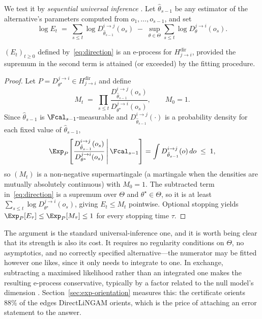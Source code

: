 We test it by \emph{sequential universal inference}
\citep{wasserman2020universal}. Let $\hat\theta_{s-1}$ be any estimator of the
alternative's parameters computed from $o_1, \dots, o_{s-1}$, and set
\begin{equation}\label{eq:direction}
\log E_t \;=\; \sum_{s \le t} \log D^{i \to j}_{\hat\theta_{s-1}}(o_s)
\;-\; \sup_{\theta \in \Theta} \sum_{s \le t} \log D^{j \to i}_{\theta}(o_s).
\end{equation}

\begin{proposition}\label{prop:direction}
$(E_t)_{t \ge 0}$ defined by~\eqref{eq:direction} is an e-process for
$H^{\mathrm{dir}}_{j \to i}$, provided the supremum in the second term is
attained (or exceeded) by the fitting procedure.
\end{proposition}

\begin{proof}
Let $P = D^{j \to i}_{\theta^\star} \in H^{\mathrm{dir}}_{j \to i}$ and define
\begin{equation*}
M_t \;=\; \prod_{s \le t}
  \frac{D^{i \to j}_{\hat\theta_{s-1}}(o_s)}{D^{j \to i}_{\theta^\star}(o_s)},
  \qquad M_0 = 1 .
\end{equation*}
Since $\hat\theta_{s-1}$ is $\Fcal_{s-1}$-measurable and
$D^{i \to j}_{\hat\theta_{s-1}}(\cdot)$ is a probability density for each
fixed value of $\hat\theta_{s-1}$,
\begin{equation*}
\Exp_P\!\left[ \frac{D^{i \to j}_{\hat\theta_{s-1}}(o_s)}
  {D^{j \to i}_{\theta^\star}(o_s)} \,\middle|\, \Fcal_{s-1} \right]
= \int D^{i \to j}_{\hat\theta_{s-1}}(o) \, do \;\le\; 1,
\end{equation*}
so $(M_t)$ is a non-negative supermartingale (a martingale when the densities
are mutually absolutely continuous) with $M_0 = 1$. The subtracted term
in~\eqref{eq:direction} is a supremum over $\Theta$ and $\theta^\star \in
\Theta$, so it is at least $\sum_{s\le t} \log D^{j\to i}_{\theta^\star}(o_s)$,
giving $E_t \le M_t$ pointwise. Optional stopping yields
$\Exp_P[E_\tau] \le \Exp_P[M_\tau] \le 1$ for every stopping time $\tau$.
\end{proof}

The argument is the standard universal-inference one, and it is worth being
clear that its strength is also its cost. It requires no regularity conditions
on $\Theta$, no asymptotics, and no correctly specified alternative---the
numerator may be fitted however one likes, since it only needs to integrate to
one. In exchange, subtracting a maximised likelihood rather than an integrated
one makes the resulting e-process conservative, typically by a factor related
to the null model's dimension \citep{tse2022note}.
Section~\ref{sec:exp-orientation} measures this: the certificate orients
$88\%$ of the edges DirectLiNGAM orients, which is the price of attaching an
error statement to the answer.

